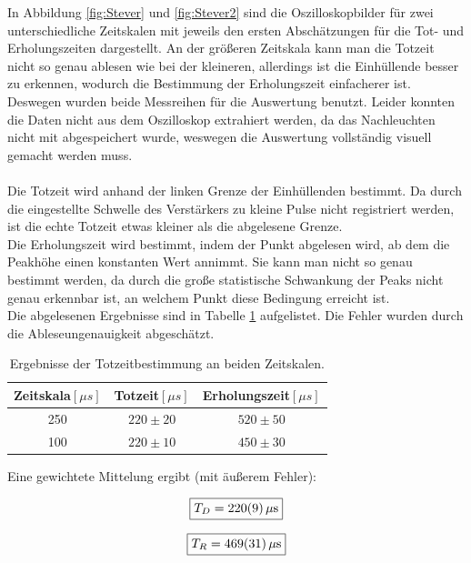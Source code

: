 \documentclass[12pt,a4paper]{article}
\begin{document}
In Abbildung \ref{fig:Stever} und \ref{fig:Stever2} sind die Oszilloskopbilder für zwei unterschiedliche Zeitskalen mit jeweils den ersten Abschätzungen für die Tot- und Erholungszeiten dargestellt. An der größeren Zeitskala kann man die Totzeit nicht so genau ablesen wie bei der kleineren, allerdings ist die Einhüllende besser zu erkennen, wodurch die Bestimmung der Erholungszeit einfacherer ist. Deswegen wurden beide Messreihen für die Auswertung benutzt.
Leider konnten die Daten nicht aus dem Oszilloskop extrahiert werden, da das Nachleuchten nicht mit abgespeichert wurde, weswegen die Auswertung vollständig visuell gemacht werden muss.\\
\\
Die Totzeit wird anhand der linken Grenze der Einhüllenden bestimmt. Da durch die eingestellte Schwelle des Verstärkers zu kleine Pulse nicht registriert werden, ist die echte Totzeit etwas kleiner als die abgelesene Grenze.\\
Die Erholungszeit wird bestimmt, indem der Punkt abgelesen wird, ab dem die Peakhöhe einen konstanten Wert annimmt.
Sie kann man nicht so genau bestimmt werden, da durch die große statistische Schwankung der Peaks nicht genau erkennbar ist, an welchem Punkt diese Bedingung erreicht ist.\\
Die abgelesenen Ergebnisse sind in Tabelle \ref{teb:Stever} aufgelistet. Die Fehler wurden durch die Ableseungenauigkeit abgeschätzt.

\begin{table}[H]
\centering
\begin{tabular}{|c|c|c|}
\hline
Zeitskala$[\mu s]$ & Totzeit$[\mu s]$ & Erholungszeit$[\mu s]$\\
\hline 
250 & $220\pm 20$ & $520\pm 50$ \\
\hline 
100 & $220\pm 10$ & $450\pm 30$ \\
\hline
\end{tabular}
\caption{Ergebnisse der Totzeitbestimmung an beiden Zeitskalen. }
\label{teb:Stever}
\end{table}

Eine gewichtete Mittelung ergibt (mit äußerem Fehler):

\begin{equation}
\boxed{T_D = \SI{220 \pm 9}{\mu s}}
\end{equation}

\begin{equation}
\boxed{T_R = \SI{469 \pm 31}{\mu s}}
\end{equation}
\end{document}
